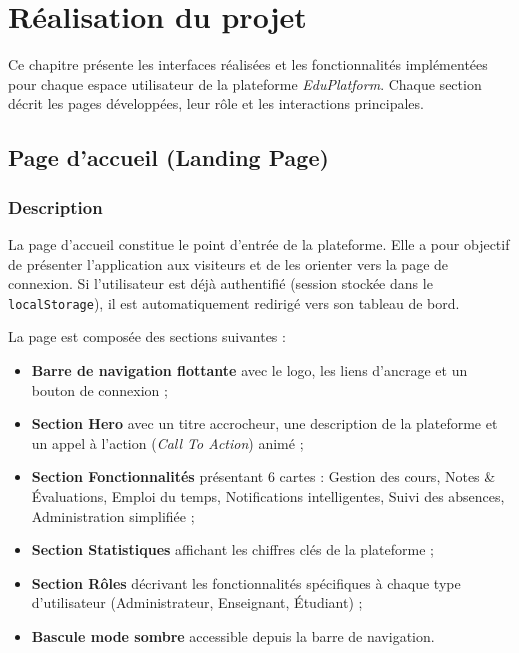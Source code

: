 \chapter{Réalisation du projet}

Ce chapitre présente les interfaces réalisées et les fonctionnalités implémentées pour chaque espace utilisateur de la plateforme \textit{EduPlatform}. Chaque section décrit les pages développées, leur rôle et les interactions principales.


\section{Page d'accueil (Landing Page)}

\subsection{Description}

La page d'accueil constitue le point d'entrée de la plateforme. Elle a pour objectif de présenter l'application aux visiteurs et de les orienter vers la page de connexion. Si l'utilisateur est déjà authentifié (session stockée dans le \texttt{localStorage}), il est automatiquement redirigé vers son tableau de bord.

\vspace{0.3cm}

La page est composée des sections suivantes :
\begin{itemize}[noitemsep]
    \item \textbf{Barre de navigation flottante} avec le logo, les liens d'ancrage et un bouton de connexion ;
    \item \textbf{Section Hero} avec un titre accrocheur, une description de la plateforme et un appel à l'action (\textit{Call To Action}) animé ;
    \item \textbf{Section Fonctionnalités} présentant 6 cartes : Gestion des cours, Notes \& Évaluations, Emploi du temps, Notifications intelligentes, Suivi des absences, Administration simplifiée ;
    \item \textbf{Section Statistiques} affichant les chiffres clés de la plateforme ;
    \item \textbf{Section Rôles} décrivant les fonctionnalités spécifiques à chaque type d'utilisateur (Administrateur, Enseignant, Étudiant) ;
    \item \textbf{Bascule mode sombre} accessible depuis la barre de navigation.
\end{itemize}

